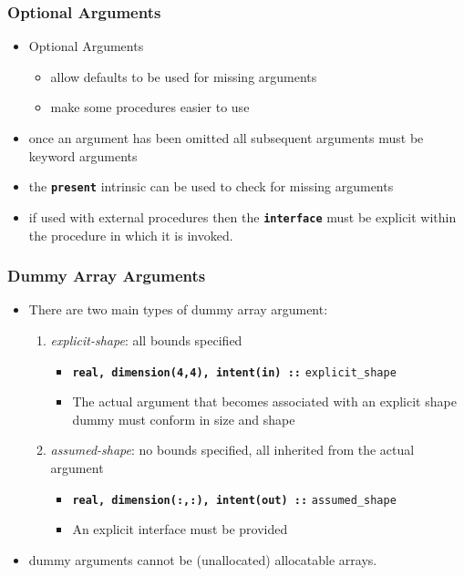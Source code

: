 \documentclass[slidestop,mathserif,compress,xcolor=svgnames]{beamer}
\begin{document}
\begin{frame}
  \frametitle{\small Optional Arguments}
  \begin{block}{}
    \begin{itemize}
      \item Optional Arguments
      \begin{itemize}
        \item allow defaults to be used for missing arguments
        \item make some procedures easier to use
      \end{itemize}
      \item once an argument has been omitted all subsequent arguments must be keyword arguments
      \item the \textbf{\texttt{present}} intrinsic can be used to check for missing arguments
      \item if used with external procedures then the \textbf{\texttt{interface}} must be explicit within the procedure in which it is invoked.
    \end{itemize}
  \end{block}
\end{frame}

\begin{frame}
  \frametitle{\small Dummy Array Arguments}
  \begin{itemize}
    \item There are two main types of dummy array argument:
    \begin{enumerate}
      \item \textit{explicit-shape}: all bounds specified
      \begin{itemize}
        \item \textbf{\texttt{real, dimension(4,4), intent(in) ::}} \texttt{explicit\_shape}
        \item[] The actual argument that becomes associated with an explicit shape dummy must conform in size and shape
      \end{itemize}
      \item \textit{assumed-shape}: no bounds specified, all inherited from the actual argument
      \begin{itemize}
        \item \textbf{\texttt{real, dimension(:,:), intent(out) ::}} \texttt{assumed\_shape}
        \item An explicit interface must be provided
      \end{itemize}
    \end{enumerate}
    \item dummy arguments cannot be (unallocated) allocatable arrays.
  \end{itemize}
\end{frame}
\end{document}
